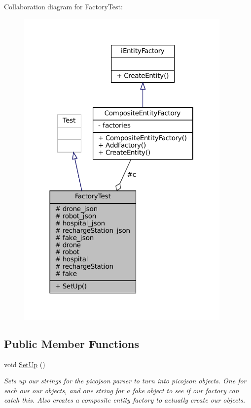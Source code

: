 Collaboration diagram for Factory\+Test\+:\nopagebreak
\begin{figure}[H]
\begin{center}
\leavevmode
\includegraphics[width=298pt]{classFactoryTest__coll__graph}
\end{center}
\end{figure}
\subsection*{Public Member Functions}
\begin{DoxyCompactItemize}
\item 
\mbox{\label{classFactoryTest_ab6472ece25a6c39a969974d839c4fbfe}} 
void \hyperlink{classFactoryTest_ab6472ece25a6c39a969974d839c4fbfe}{Set\+Up} ()
\begin{DoxyCompactList}\small\item\em Sets up our strings for the picojson parser to turn into picojson objects. One for each our our objects, and one string for a fake object to see if our factory can catch this. Also creates a composite entity factory to actually create our objects. \end{DoxyCompactList}\end{DoxyCompactItemize}

